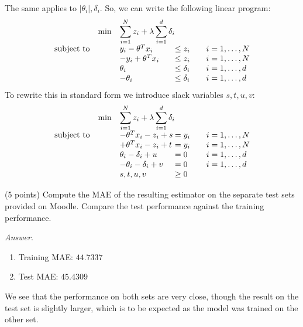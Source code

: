 \documentclass[10pt]{article}
\newenvironment{exercise}[2][Exercise]{\begin{trivlist}
  \item[\hskip \labelsep {\bfseries #1}\hskip \labelsep {\bfseries #2.}]}{\end{trivlist}}
\begin{document}
\begin{exercise}{2.1}
The same applies to $|\theta_i|, \delta_i$. So, we can write the following linear program:
\begin{equation*}
\begin{array}{lll@{}lll}
&\text{min}  &\displaystyle\sum\limits_{i=1}^{N}z_i +  \lambda\sum\limits_{i=1}^{d}\delta_i &\\
\text{subject to} 
&& y_i-\theta^Tx_i &\leq z_i && i=1 ,\dots, N \\
&& -y_i+\theta^Tx_i &\leq z_i && i=1 ,\dots, N \\
                 && \theta_i &\leq \delta_i &&  i=1 ,\dots, d \\
                && -\theta_i &\leq \delta_i &&  i=1 ,\dots, d 
\end{array}
\end{equation*}
To rewrite this in standard form we introduce slack variables $s,t,u,v$: 
\begin{equation*}
\begin{array}{lll@{}lll}
&\text{min}  &\displaystyle\sum\limits_{i=1}^{N}z_i +  \lambda\sum\limits_{i=1}^{d}\delta_i &\\
\text{subject to} 
&& -\theta^Tx_i - z_i + s &= y_i && i=1 ,\dots, N \\
&& +\theta^Tx_i -z_i + t &= y_i && i=1 ,\dots, N \\
                 && \theta_i - \delta_i + u&= 0  &&  i=1 ,\dots, d \\
                && -\theta_i - \delta_i + v &= 0  &&  i=1 ,\dots, d 
                \\
                && s,t,u,v &\geq 0  && 
\end{array}
\end{equation*}
\end{exercise}

\begin{exercise}{2.2}
(5 points)
Compute
the MAE of the resulting estimator on the separate test sets provided on
Moodle. Compare the test performance against the training performance. 

\textit{Answer}. 
\begin{enumerate}
    \item Training MAE: $44.7337$
    \item Test MAE: $45.4309$
\end{enumerate}
We see that the performance on both sets are very close, though the result on the test set is slightly larger, which is to be expected as the model was trained on the other set.
\end{exercise}
\end{document}
